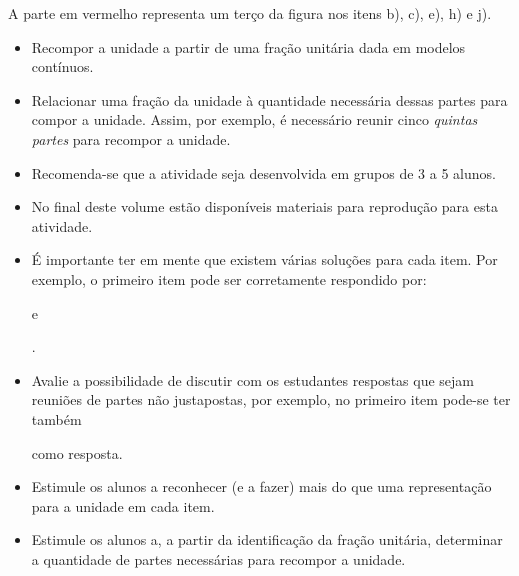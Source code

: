 \begin{solucao}{}{}
A parte em vermelho representa um terço da figura nos itens b), c), e), h) e j).
\end{solucao}
\pagebreak

\begin{objetivos}{}{}
  \begin{itemize} %
    \item       Recompor a unidade a partir de uma fração unitária dada em modelos contínuos.
    \item       Relacionar uma fração da unidade à quantidade necessária dessas partes para compor a unidade. Assim, por exemplo, é necessário reunir cinco       {\it quintas partes}       para recompor a unidade.
\end{itemize} %
\end{objetivos}

\begin{orientacoes}
  \begin{itemize} %
  \item Recomenda-se que a atividade seja desenvolvida em grupos de 3 a 5 alunos.
    \item No final deste volume estão disponíveis materiais para
reprodução para esta atividade.
    \item É importante ter em mente que existem várias soluções para cada item. Por exemplo, o primeiro item pode ser corretamente respondido por:             
 e
 .
    \item       Avalie a possibilidade de discutir com os estudantes respostas que sejam reuniões de partes não justapostas, por exemplo, no primeiro item pode-se ter também             
      como resposta.
    \item Estimule os alunos a reconhecer (e a fazer) mais do que uma representação para a unidade em cada item.
    \item Estimule os alunos a, a partir da identificação da fração unitária, determinar a quantidade de partes necessárias para recompor a unidade.
\end{itemize} %
\end{orientacoes}

